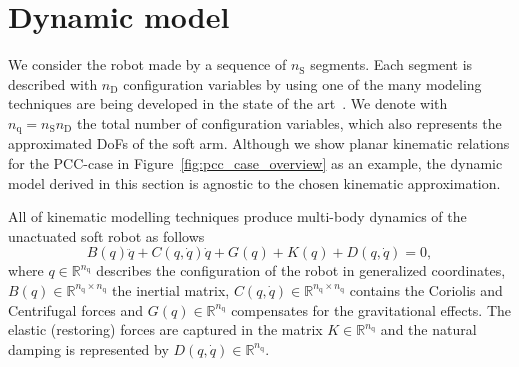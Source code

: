 \section{Dynamic model}\label{sec:dynamic_model}

We consider the robot made by a sequence of $n_{\mathrm{S}}$ segments. Each segment is described with $n_{\mathrm{D}}$ configuration variables by using one of the many modeling techniques are being developed in the state of the art~\cite{faure2012sofa, grazioso2018geometrically, sadati2019TMTDyn, boyer2020dynamics}.
%
We denote with $n_{\mathrm{q}} = n_{\mathrm{S}} n_{\mathrm{D}}$ the total number of configuration variables, which also represents the approximated DoFs of the soft arm.
%
Although we show planar kinematic relations for the \gls{PCC}-case in Figure~\ref{fig:pcc_case_overview} as an example, the dynamic model derived in this section is agnostic to the chosen kinematic approximation.
%

All of kinematic modelling techniques produce multi\--body dynamics of the unactuated soft robot as follows~\cite{della2021survey}
%
\begin{equation}
	B(q)\ddot{q} + C(q,\dot{q}) \dot{q} + G(q) + K(q) + D(q, \dot{q}) = 0,
\end{equation}
%
where $q \in \mathbb{R}^{n_{\mathrm{q}}}$ describes the configuration of the robot in generalized coordinates, $B(q) \in \mathbb{R}^{n_{\mathrm{q}} \times n_{\mathrm{q}}}$ the inertial matrix, $C(q,\dot{q}) \in \mathbb{R}^{n_{\mathrm{q}} \times n_{\mathrm{q}}}$ contains the Coriolis and Centrifugal forces and $G(q) \in \mathbb{R}^{n_{\mathrm{q}}}$ compensates for the gravitational effects. The elastic (restoring) forces are captured in the matrix $K \in \mathbb{R}^{n_{\mathrm{q}}}$ and the natural damping is represented by $D(q,\dot{q}) \in \mathbb{R}^{n_{\mathrm{q}}}$.


